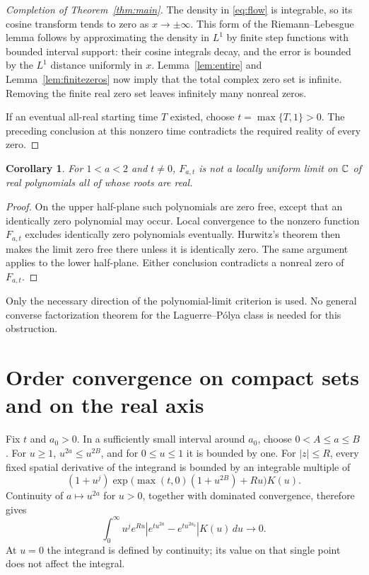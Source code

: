 \documentclass[11pt]{article}
\newtheorem{corollary}[theorem]{Corollary}
\theoremstyle{remark}\newtheorem{remark}[theorem]{Remark}
\begin{document}
\begin{proof}[Completion of Theorem~\ref{thm:main}]
The density in \eqref{eq:flow} is integrable, so its cosine transform
tends to zero as $x\to\pm\infty$. This form of the Riemann--Lebesgue
lemma follows by approximating the density in $L^1$ by finite step
functions with bounded interval support: their cosine integrals
decay, and the error is bounded by the $L^1$ distance uniformly in $x$.
Lemma~\ref{lem:entire} and Lemma~\ref{lem:finitezeros} now imply
that the total complex zero set is infinite. Removing the finite
real zero set leaves infinitely many nonreal zeros.

If an eventual all-real starting time $T$ existed, choose
$t=\max\{T,1\}>0$. The preceding conclusion at this nonzero time
contradicts the required reality of every zero.
\end{proof}

\begin{corollary}\label{cor:lp}
For $1<a<2$ and $t\neq0$, $F_{a,t}$ is not a locally uniform limit
on $\mathbb C$ of real polynomials all of whose roots are real.
\end{corollary}
\begin{proof}
On the upper half-plane such polynomials are zero free, except that
an identically zero polynomial may occur. Local convergence to the
nonzero function $F_{a,t}$ excludes identically zero polynomials
eventually. Hurwitz's theorem then makes the limit zero free there
unless it is identically zero. The same argument applies to the
lower half-plane. Either conclusion contradicts a nonreal zero of
$F_{a,t}$.
\end{proof}

Only the necessary direction of the polynomial-limit criterion is
used. No general converse factorization theorem for the
Laguerre--P\'olya class is needed for this obstruction.

\section{Order convergence on compact sets and on the real axis}
Fix $t$ and $a_0>0$. In a sufficiently small interval around $a_0$,
choose $0<A\leq a\leq B$. For $u\geq1$,
$u^{2a}\leq u^{2B}$, and for $0\leq u\leq1$ it is bounded by one.
For $|z|\leq R$, every fixed spatial derivative of the integrand
is bounded by an integrable multiple of
\[
 (1+u^j)\exp\big(\max(t,0)(1+u^{2B})+Ru\big)K(u).
\]
Continuity of $a\mapsto u^{2a}$ for $u>0$, together with dominated
convergence, therefore gives
\begin{equation}\label{eq:weightedlimit}
 \int_0^\infty u^j e^{Ru}
 |e^{tu^{2a}}-e^{tu^{2a_0}}|K(u)\,du\longrightarrow0.
\end{equation}
At $u=0$ the integrand is defined by continuity; its value on that
single point does not affect the integral.
\end{document}

